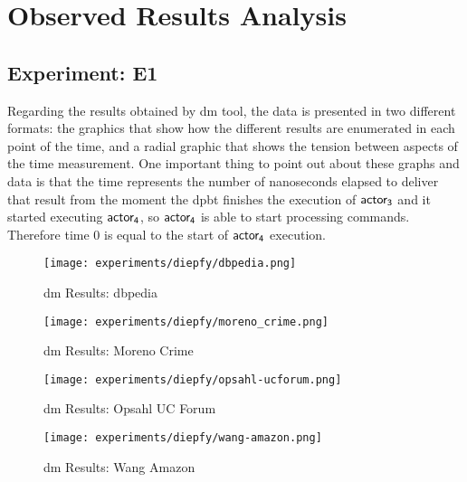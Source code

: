 \section{\textbf{Observed Results Analysis}}\label{sec:discussion}
\subsection{Experiment: E1}\label{sub:sec:res:e1}
Regarding the results obtained by \acrshort{dm} tool, the data is presented in two different formats: the graphics that show 
how the different results are enumerated in each point of the time, and a radial graphic that shows the tension between aspects of the time measurement.
One important thing to point out about these graphs and data is that the time represents the number of nanoseconds elapsed to deliver that result from the moment the \acrshort{dpbt} finishes the execution of $\mathsf{actor_3}$ and it started executing $\mathsf{actor_4}$, so $\mathsf{actor_4}$ is able to start processing commands. 
Therefore time $0$ is equal to the start of $\mathsf{actor_4}$ execution.

\begin{figure}[!htb]
  \centering
  \begin{minipage}{0.5\textwidth}
   \texttt{[image: experiments/diepfy/dbpedia.png]}
    \caption{\acrshort{dm} Results: \acrshort{dbpedia}}
    \label{fig:dief:dbpedia}
  \end{minipage}%
  \begin{minipage}{0.5\textwidth}
   \texttt{[image: experiments/diepfy/moreno\_crime.png]}
    \caption{\acrshort{dm} Results: Moreno Crime}
    \label{fig:dief:moreno}
  \end{minipage}
\end{figure}
%
\begin{figure}[!htb]
  \centering
  \begin{minipage}{0.5\textwidth}
   \texttt{[image: experiments/diepfy/opsahl-ucforum.png]}
    \caption{\acrshort{dm} Results: Opsahl UC Forum}
    \label{fig:dief:opsahl}
  \end{minipage}%
  \begin{minipage}{0.5\textwidth}
    \texttt{[image: experiments/diepfy/wang-amazon.png]}
     \caption{\acrshort{dm} Results: Wang Amazon}
     \label{fig:dief:wang}
   \end{minipage}
 \end{figure}

